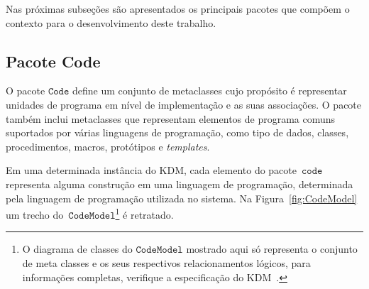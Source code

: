  Nas próximas subseções são apresentados os principais pacotes que compõem o contexto para o desenvolvimento deste trabalho.

\subsection{Pacote Code}\label{codePackage}

O pacote $\mathtt{Code}$ define um conjunto de metaclasses cujo propósito é representar unidades de programa em nível de implementação e as suas associações. O pacote também inclui metaclasses que representam elementos de programa comuns suportados por várias linguagens de programação, como tipo de dados, classes, procedimentos, macros, protótipos e \textit{templates}.



Em uma determinada instância do KDM, cada elemento do pacote~$\mathtt{code}$ representa alguma construção em uma linguagem de programação, determinada pela linguagem de programação utilizada no sistema. Na Figura~\ref{fig:CodeModel} um trecho do~$\mathtt{CodeModel}$\footnote{O diagrama de classes do $\mathtt{CodeModel}$ mostrado aqui só representa o conjunto de meta classes e os seus respectivos relacionamentos lógicos, para informações completas, verifique a especificação do KDM~\cite{KDM:specification}.} é retratado.


